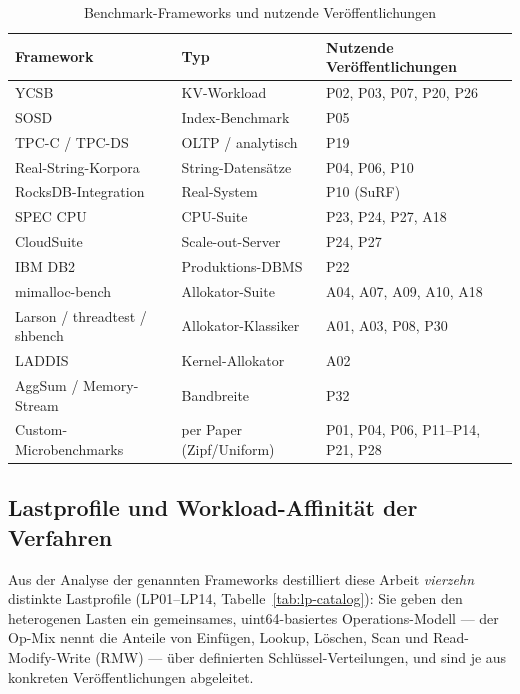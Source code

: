 \begin{table}[!htbp]
  \caption{Benchmark-Frameworks und nutzende Veröffentlichungen}\label{tab:wl-frameworks}
  \centering\footnotesize
  \begin{tabular}{@{}p{3.2cm} p{2.8cm} p{6cm}@{}}
    \toprule
    \textbf{Framework} & \textbf{Typ} & \textbf{Nutzende Veröffentlichungen} \\
    \midrule
    YCSB~\cite{cooper2010ycsb} & KV-Workload & P02, P03, P07, P20, P26 \\
    SOSD~\cite{kipf2019sosd} & Index-Benchmark & P05 \\
    TPC-C / TPC-DS~\cite{tpc_benchmarks} & OLTP / analytisch & P19 \\
    Real-String-Korpora & String-Datensätze & P04, P06, P10 \\
    RocksDB-Integration & Real-System & P10 (SuRF) \\
    SPEC CPU~\cite{spec_cpu2017} & CPU-Suite & P23, P24, P27, A18 \\
    CloudSuite~\cite{ferdman2012cloudsuite} & Scale-out-Server & P24, P27 \\
    IBM DB2 & Produktions-DBMS & P22 \\
    mimalloc-bench~\cite{mimalloc_bench} & Allokator-Suite & A04, A07, A09, A10, A18 \\
    Larson / threadtest / shbench & Allokator-Klassiker & A01, A03, P08, P30 \\
    LADDIS & Kernel-Allokator & A02 \\
    AggSum / Memory-Stream & Bandbreite & P32 \\
    Custom-Microbenchmarks & per Paper (Zipf/Uniform) & P01, P04, P06, P11--P14, P21, P28 \\
    \bottomrule
  \end{tabular}
\end{table}

\subsection{Lastprofile und Workload-Affinität der Verfahren}\label{ssec:sota-wl-profiles}
Aus der Analyse der genannten Frameworks destilliert diese Arbeit \emph{vierzehn} distinkte
Lastprofile (LP01--LP14, Tabelle~\ref{tab:lp-catalog}): Sie geben den heterogenen Lasten ein
gemeinsames, uint64-basiertes Operations-Modell --- der Op-Mix nennt die Anteile von Einfügen,
Lookup, Löschen, Scan und Read-Modify-Write (RMW) --- über definierten Schlüssel-Verteilungen, und
sind je aus konkreten Veröffentlichungen abgeleitet.

